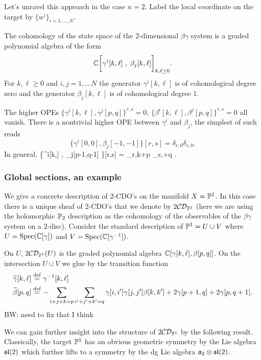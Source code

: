 \documentclass[11pt]{amsart}
\def\CDO{{\cC\cD}}
\def\brian#1{{\textcolor{blue!65!red}{BW: {#1}}}}
\begin{document}
Let's unravel this approach in the case $n=2$. 
Label the local coordinate on the target by $\{w^i\}_{i=1,\ldots,N}$. 

The cohomology of the state space of the $2$-dimensional $\beta\gamma$ system is a graded polynomial algebra of the form
\[
\CC\bigg[\gamma^i[k,\ell] \; , \; \beta_j [k,\ell] \bigg]_{k,\ell \geq 0} .
\]
For $k,\ell \geq 0$ and $i,j=1,\ldots N$ the generator $\gamma^i[k,\ell]$ is of cohomological degree zero and the generator $\beta_j[k,\ell]$ is of cohomological degree $1$.

The higher OPEs $\{\gamma^i[k,\ell], \gamma^j [p,q]\}^{r,s} = 0$, $\{\beta^i[k,\ell], \beta^j [p,q]\}^{r,s} = 0$ all vanish. 
There is a nontrivial higher OPE between $\gamma^i$ and $\beta_j$, the simplest of such reads
\[
\big\{\gamma^i[0,0] , \beta_j[-1,-1] \big\}[r,s] = \delta_{r,0} \delta_{s,0} .
\]
In general, 
\beqn\label{eqn:bgope}
\big\{\gamma^i[k,\ell] , \beta_j[p-1,q-1] \big\}[r,s] = \delta_{r,k+p} \delta_{s,\ell+q} .
\eeqn

\subsubsection{Global sections, an example}

We give a concrete description of 2-CDO's on the manifold $X = \PP^1$.
In this case there is a unique sheaf of 2-CDO's that we denote by $2\CDO_{\PP^1}$ (here we are using the holomorphic $\PP_2$ description as the cohomology of the observables of the $\beta\gamma$ system on a $2$-disc).
Consider the standard description of $\PP^1 = U \cup V$ where $U = {\rm Spec}(\CC[\gamma])$ and $V = {\rm Spec}(\CC[\gamma^{-1}])$. 

On $U$, $2\CDO_{\PP^1}(U)$ is the graded polynomial algebra $\CC[\gamma[k,\ell], \beta[p,q]]$. 
On the intersection $U \cup V$ we glue by the transition function
\begin{align*}
\Tilde{\gamma} [k,\ell] & \define \gamma^{-1} [k,\ell] \\
\Tilde{\beta} [p,q] & \define - \sum_{i+j+k=p} \sum_{i'+j'+k'=q} \gamma[i,i'] \gamma[j,j'] \beta[k,k'] + 2 \gamma[p+1, q] + 2 \gamma[p, q+1] .
\end{align*}
\brian{need to fix that I think}

We can gain further insight into the structure of $2\CDO_{\PP^1}$ by the following result. 
Classically, the target $\PP^1$ has an obvious geometric symmetry by the Lie algebra $\sl(2)$ which further lifts to a symmetry by the dg Lie algebra $\fa_2 \otimes \sl(2)$. 
\end{document}
